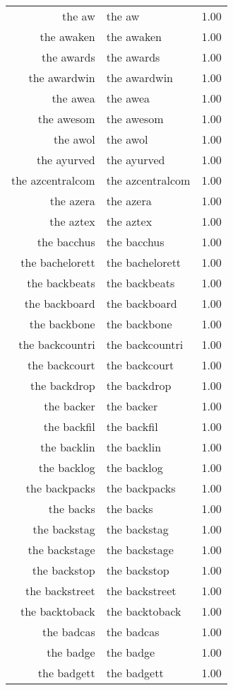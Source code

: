 \begin{table}[ht]
\begin{tabular}{rlr}
  the aw & the aw & 1.00 \\ 
  the awaken & the awaken & 1.00 \\ 
  the awards & the awards & 1.00 \\ 
  the awardwin & the awardwin & 1.00 \\ 
  the awea & the awea & 1.00 \\ 
  the awesom & the awesom & 1.00 \\ 
  the awol & the awol & 1.00 \\ 
  the ayurved & the ayurved & 1.00 \\ 
  the azcentralcom & the azcentralcom & 1.00 \\ 
  the azera & the azera & 1.00 \\ 
  the aztex & the aztex & 1.00 \\ 
  the bacchus & the bacchus & 1.00 \\ 
  the bachelorett & the bachelorett & 1.00 \\ 
  the backbeats & the backbeats & 1.00 \\ 
  the backboard & the backboard & 1.00 \\ 
  the backbone & the backbone & 1.00 \\ 
  the backcountri & the backcountri & 1.00 \\ 
  the backcourt & the backcourt & 1.00 \\ 
  the backdrop & the backdrop & 1.00 \\ 
  the backer & the backer & 1.00 \\ 
  the backfil & the backfil & 1.00 \\ 
  the backlin & the backlin & 1.00 \\ 
  the backlog & the backlog & 1.00 \\ 
  the backpacks & the backpacks & 1.00 \\ 
  the backs & the backs & 1.00 \\ 
  the backstag & the backstag & 1.00 \\ 
  the backstage & the backstage & 1.00 \\ 
  the backstop & the backstop & 1.00 \\ 
  the backstreet & the backstreet & 1.00 \\ 
  the backtoback & the backtoback & 1.00 \\ 
  the badcas & the badcas & 1.00 \\ 
  the badge & the badge & 1.00 \\ 
  the badgett & the badgett & 1.00 \\ 

\end{tabular}
\end{table}
